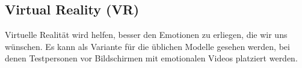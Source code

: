 \subsection{Virtual Reality (VR)} \label{grund-vr}


Virtuelle Realität wird helfen, besser den Emotionen zu erliegen, die wir uns wünschen. Es kann als Variante für die üblichen Modelle gesehen werden, bei denen Testpersonen vor Bildschirmen mit emotionalen Videos platziert werden. 
